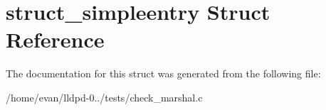 \section{struct\-\_\-simpleentry \-Struct \-Reference}
\label{structstruct__simpleentry}


\-The documentation for this struct was generated from the following file\-:\begin{DoxyCompactItemize}
\item 
/home/evan/lldpd-\/0../tests/check\-\_\-marshal.\-c\end{DoxyCompactItemize}
